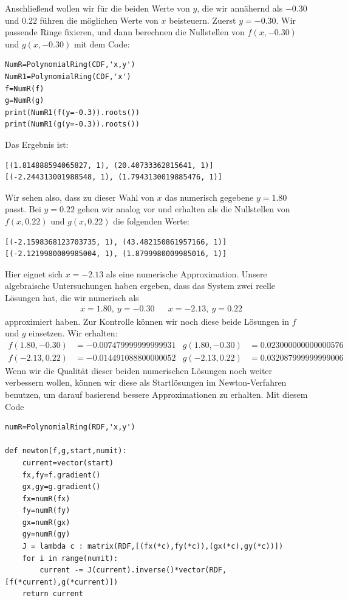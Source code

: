 \documentclass[11pt]{article}
\numberwithin{equation}{section}
\begin{document}
\begin{beispiel}
Anschließend wollen wir für die beiden Werte von $y$, die wir annähernd als $-0{.}30$ und $0{.}22$ führen die möglichen Werte von $x$ beisteuern. Zuerst $y=-0{.}30$.  Wir passende Ringe fixieren, und dann berechnen die Nullstellen von $f(x,-0{.}30)$ und $g(x,-0{.}30)$ mit dem Code: 
\begin{verbatim}
NumR=PolynomialRing(CDF,'x,y')
NumR1=PolynomialRing(CDF,'x')
f=NumR(f)
g=NumR(g)
print(NumR1(f(y=-0.3)).roots())
print(NumR1(g(y=-0.3)).roots())
\end{verbatim}
Das Ergebnis ist: 
\begin{verbatim}
[(1.814888594065827, 1), (20.40733362815641, 1)]
[(-2.244313001988548, 1), (1.7943130019885476, 1)]
\end{verbatim} 
Wir sehen also, dass zu dieser Wahl von $x$ das numerisch gegebene  $y=1{.}80$ passt. Bei $y=0{.}22$ gehen wir analog vor und erhalten als die Nullstellen von $f(x,0{.}22)$ und $g(x,0{.}22)$ die folgenden Werte: 
\begin{verbatim}
[(-2.1598368123703735, 1), (43.482150861957166, 1)]
[(-2.1219980009985004, 1), (1.8799980009985016, 1)]
\end{verbatim} 
Hier eignet sich $x=-2{.}13$ als eine numerische Approximation. Unsere algebraische Untersuchungen haben ergeben, dass das System zwei reelle Lösungen hat, die wir numerisch als 
\begin{align*}
		& x= 1{.}80, \ y= -0{.}3 0& & x = -2{.}13 , \ y =  0{.}22
\end{align*} 
approximiert haben. Zur Kontrolle können wir noch diese beide Lösungen in $f$ und $g$ einsetzen. Wir erhalten: 
\begin{align*}
		f(1{.}80,-0{.}30) & = - 0.007479999999999931 & g(1{.}80,-0{.}30)  & = 0.023000000000000576
		\\ f(-2{.}13, 0{.}22)  & = -0.014491088800000052  &  g(-2{.}13,0{.}22) & =  0.032087999999999006
\end{align*} 
Wenn wir die Qualität dieser beiden numerischen Lösungen noch weiter verbessern wollen, können wir diese als Startlösungen im Newton-Verfahren benutzen, um darauf  basierend bessere Approximationen zu erhalten. Mit diesem Code 
\begin{lstlisting}
numR=PolynomialRing(RDF,'x,y')

def newton(f,g,start,numit):
	current=vector(start)
	fx,fy=f.gradient()
	gx,gy=g.gradient()
	fx=numR(fx)
	fy=numR(fy)
	gx=numR(gx)
	gy=numR(gy)
	J = lambda c : matrix(RDF,[(fx(*c),fy(*c)),(gx(*c),gy(*c))])
	for i in range(numit):
		current -= J(current).inverse()*vector(RDF,[f(*current),g(*current)])
	return current


\end{lstlisting}
\end{beispiel}
\end{document}

